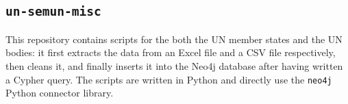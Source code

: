 \subsection{\texttt{un-semun-misc}} \label{ssec:un-semun-misc}

This repository contains scripts for the both the UN member states and the UN bodies: it first extracts the data from an Excel file and a CSV file respectively, then cleans it, and finally inserts it into the Neo4j database after having written a Cypher query. The scripts are written in Python and directly use the \texttt{neo4j} Python connector library.